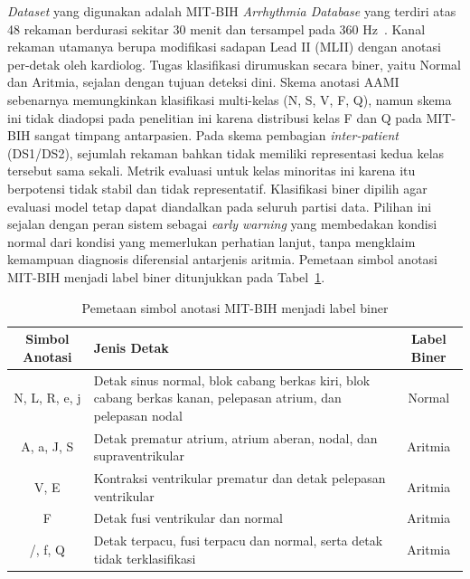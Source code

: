 \textit{Dataset} yang digunakan adalah MIT-BIH \textit{Arrhythmia Database} yang terdiri atas 48 rekaman berdurasi sekitar 30 menit dan tersampel pada 360 Hz~\cite{moody_mark_2001}. Kanal rekaman utamanya berupa modifikasi sadapan Lead II (MLII) dengan anotasi per-detak oleh kardiolog. Tugas klasifikasi dirumuskan secara biner, yaitu Normal dan Aritmia, sejalan dengan tujuan deteksi dini. Skema anotasi AAMI sebenarnya memungkinkan klasifikasi multi-kelas (N, S, V, F, Q), namun skema ini tidak diadopsi pada penelitian ini karena distribusi kelas F dan Q pada MIT-BIH sangat timpang antarpasien. Pada skema pembagian \textit{inter-patient} (DS1/DS2), sejumlah rekaman bahkan tidak memiliki representasi kedua kelas tersebut sama sekali. Metrik evaluasi untuk kelas minoritas ini karena itu berpotensi tidak stabil dan tidak representatif. Klasifikasi biner dipilih agar evaluasi model tetap dapat diandalkan pada seluruh partisi data. Pilihan ini sejalan dengan peran sistem sebagai \textit{early warning} yang membedakan kondisi normal dari kondisi yang memerlukan perhatian lanjut, tanpa mengklaim kemampuan diagnosis diferensial antarjenis aritmia. Pemetaan simbol anotasi MIT-BIH menjadi label biner ditunjukkan pada Tabel~\ref{tab:pemetaan-label}.

\begin{table}[!ht]
  \centering
  \caption{Pemetaan simbol anotasi MIT-BIH menjadi label biner}
  \label{tab:pemetaan-label}
  \begin{tabular}{c>{\RaggedRight\arraybackslash}p{7.2cm}c}
    \toprule
    \textbf{Simbol Anotasi} & \textbf{Jenis Detak} & \textbf{Label Biner} \\
    \midrule
    N, L, R, e, j & Detak sinus normal, blok cabang berkas kiri, blok cabang berkas kanan, pelepasan atrium, dan pelepasan nodal & Normal \\
    A, a, J, S & Detak prematur atrium, atrium aberan, nodal, dan supraventrikular & Aritmia \\
    V, E & Kontraksi ventrikular prematur dan detak pelepasan ventrikular & Aritmia \\
    F & Detak fusi ventrikular dan normal & Aritmia \\
    /, f, Q & Detak terpacu, fusi terpacu dan normal, serta detak tidak terklasifikasi & Aritmia \\
    \bottomrule
  \end{tabular}
\end{table}

